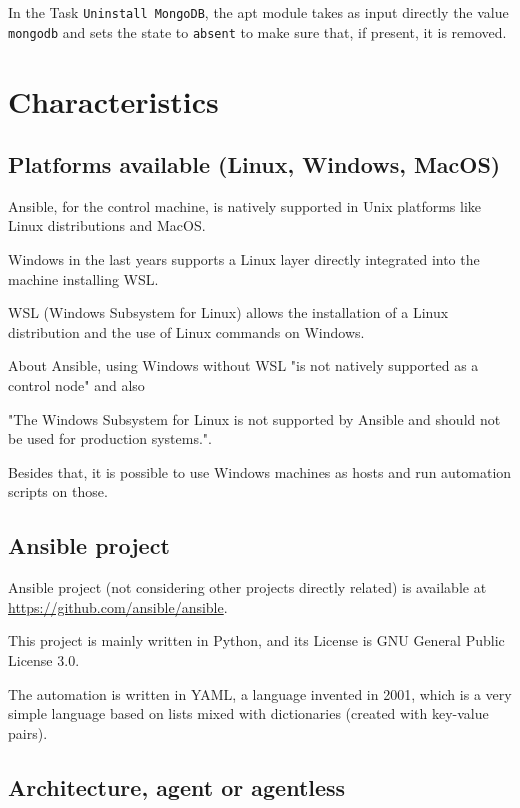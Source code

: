 \documentclass[12pt,a4paper,openright,twoside]{book}
\begin{document}
In the Task \texttt{Uninstall MongoDB}, the apt module takes as input directly the value \texttt{mongodb} and sets the state to \texttt{absent} to make sure that, if present, it is removed.

\section{Characteristics}

\subsection{Platforms available (Linux, Windows, MacOS)}
Ansible, for the control machine, is natively supported in Unix platforms like Linux distributions and MacOS.

Windows in the last years supports a Linux layer directly integrated into the machine installing WSL.

WSL (Windows Subsystem for Linux) allows the installation of a Linux distribution and the use of Linux commands on Windows.


About Ansible, using Windows without WSL "is not natively supported as a control node"\cite{ansibleDocInstallIntro} and also


"The Windows Subsystem for Linux is not supported by Ansible and should not be used for production systems."\cite{ansibleWinFaq}.


Besides that, it is possible to use Windows machines as hosts and run automation scripts on those.

\subsection{Ansible project}

Ansible project (not considering other projects directly related) is available at \url{https://github.com/ansible/ansible}\cite{ansibleGithub}.


This project is mainly written in Python, and its License is GNU General Public License 3.0.


The automation is written in YAML, a language invented in 2001, which is a very simple language based on lists mixed with dictionaries (created with key-value pairs).

\subsection{Architecture, agent or agentless}
\end{document}
